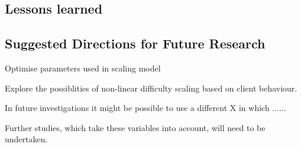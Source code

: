 \subsection{Lessons learned}
\subsection{Suggested Directions for Future Research}

Optimise parameters used in scaling model

Explore the possiblities of non-linear difficulty scaling based on client behaviour. 

In future investigations it might be possible to use a different X in which ...... 

Further studies, which take these variables into account, will need to be undertaken.
